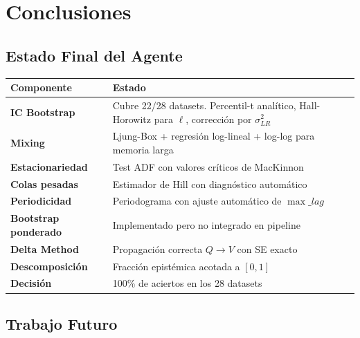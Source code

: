 \documentclass[12pt,a4paper]{article}
\newcommand{\ok}{\textcolor{cbgreen}{\checkmark}}\newcommand{\fail}{\textcolor{cbred}{$\times$}}
\begin{document}
\newpage

\section{Conclusiones}

\subsection{Estado Final del Agente}

\begin{longtable}{@{}lp{8cm}@{}}
	\toprule
	Componente                   & Estado                                                                                                     \\
	\midrule
	\endhead
	\textbf{IC Bootstrap}        & \ok Cubre 22/28 datasets. Percentil-t analítico, Hall-Horowitz para $\ell$, corrección por $\sigma^2_{LR}$ \\
	\textbf{Mixing}              & \ok Ljung-Box + regresión log-lineal + log-log para memoria larga                                          \\
	\textbf{Estacionariedad}     & \ok Test ADF con valores críticos de MacKinnon                                                             \\
	\textbf{Colas pesadas}       & \ok Estimador de Hill con diagnóstico automático                                                           \\
	\textbf{Periodicidad}        & \ok Periodograma con ajuste automático de $\max\_lag$                                                      \\
	\textbf{Bootstrap ponderado} & \ok Implementado pero no integrado en pipeline                                                             \\
	\textbf{Delta Method}        & \ok Propagación correcta $Q \to V$ con SE exacto                                                           \\
	\textbf{Descomposición}      & \ok Fracción epistémica acotada a $[0,1]$                                                                  \\
	\textbf{Decisión}            & \ok 100\% de aciertos en los 28 datasets                                                                   \\
	\bottomrule
\end{longtable}

\subsection{Trabajo Futuro}
\end{document}
